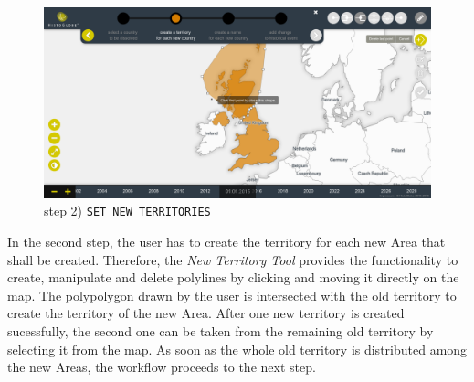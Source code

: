\begin{minipage}[t]{0.47\textwidth}

  \begin{figure}[H]
    \centering
    \includegraphics[width=1.0\textwidth]{graphics/development/final_interface/4_set_new_territories.png}
    \caption{step 2) \texttt{SET\_NEW\_TERRITORIES}}
    \label{fig:final_4_set_new_territories}
  \end{figure}

  In the second step, the user has to create the territory for each new Area that shall be created. Therefore, the \emph{New Territory Tool} provides the functionality to create, manipulate and delete polylines by clicking and moving it directly on the map. The polypolygon drawn by the user is intersected with the old territory to create the territory of the new Area. After one new territory is created sucessfully, the second one can be taken from the remaining old territory by selecting it from the map. As soon as the whole old territory is distributed among the new Areas, the workflow proceeds to the next step.

\end{minipage}

